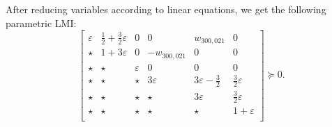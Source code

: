 \documentclass[nonacm]{acmart}
\begin{document}
After reducing variables according to linear equations,
we get the following parametric LMI:
\begin{equation*}
    \begin{bmatrix}
        \varepsilon & \frac12+\frac32\varepsilon & 0           & 0            & w_{300,021}          & 0                   \\
        \star       & 1+3\varepsilon             & 0           & -w_{300,021} & 0                    & 0                   \\
        \star       & \star                      & \varepsilon & 0            & 0                    & 0                   \\
        \star       & \star                      & \star       & 3\varepsilon & 3\varepsilon-\frac32 & \frac32\varepsilon  \\
        \star       & \star                      & \star       & \star        & 3\varepsilon         & \frac32 \varepsilon \\
        \star       & \star                      & \star       & \star        & \star                & 1+\varepsilon       \\
    \end{bmatrix}
    \succeq 0.
\end{equation*}
\end{document}
